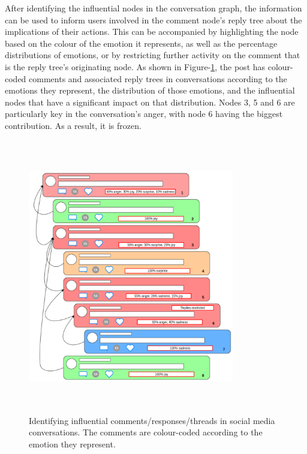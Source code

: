 \documentclass[acmtog]{acmart}
\begin{document}
After identifying the influential nodes in the conversation graph, the information can be used to inform users involved in the comment node's reply tree about the implications of their actions. This can be accompanied by highlighting the node based on the colour of the emotion it represents, as well as the percentage distributions of emotions, or by restricting further activity on the comment that is the reply tree's originating node. As shown in Figure-\ref{fig:Emotion}, the post has colour-coded comments and associated reply trees in conversations according to the emotions they represent, the distribution of those emotions, and the influential nodes that have a significant impact on that distribution. Nodes 3, 5 and 6 are particularly key in the conversation's anger, with node 6 having the biggest contribution. As a result, it is frozen.
\begin{figure}[h]
  
    \centering
    \includegraphics[width=9cm,height=12cm,keepaspectratio]{emotion_impact.pdf}
  \caption{Identifying influential comments/responses/threads in social media conversations. The comments are colour-coded according to the emotion they represent.}
  \label{fig:Emotion}
  \end{figure}
\end{document}
